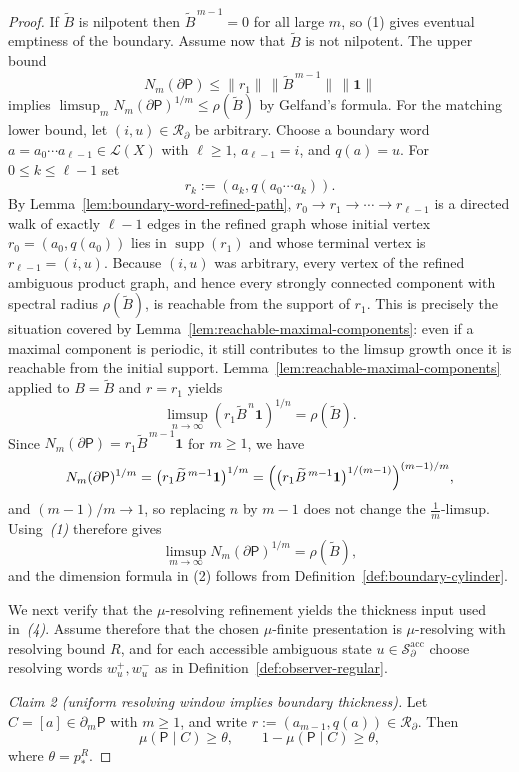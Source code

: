 \documentclass{etds}%
\numberwithin{equation}{section}
\theoremstyle{plain}
\theoremstyle{definition}
\theoremstyle{remark}
\begin{document}
\begin{proof}
If $\widetilde{B}$ is nilpotent then $\widetilde{B}^{\,m-1}=0$ for all large $m$,
so (1) gives eventual emptiness of the boundary.  Assume now that
$\widetilde{B}$ is not nilpotent.  The upper
bound
\[
N_m(\partial\mathsf{P})\le \|r_1\|\,\|\widetilde{B}^{\,m-1}\|\,\|\mathbf{1}\|
\]
implies
$\limsup_m N_m(\partial\mathsf{P})^{1/m}\le \rho(\widetilde{B})$ by Gelfand's formula.
For the matching lower bound, let $(i,u)\in\mathcal{R}_\partial$ be arbitrary.
Choose a boundary word
$a=a_0\cdots a_{\ell-1}\in\mathcal{L}(X)$ with $\ell\ge 1$, $a_{\ell-1}=i$,
and $q(a)=u$.  For $0\le k\le \ell-1$ set
\[
r_k:=(a_k,q(a_0\cdots a_k)).
\]
By Lemma~\ref{lem:boundary-word-refined-path},
$r_0\to r_1\to\cdots\to r_{\ell-1}$ is a directed walk of exactly $\ell-1$
edges in the refined graph whose initial vertex $r_0=(a_0,q(a_0))$ lies in
$\operatorname{supp}(r_1)$ and whose terminal vertex is $r_{\ell-1}=(i,u)$.
Because $(i,u)$ was arbitrary, every vertex of
the refined ambiguous product graph, and hence every strongly connected
component with spectral radius $\rho(\widetilde{B})$, is reachable from the
support of $r_1$.  This is precisely the situation covered by
Lemma~\ref{lem:reachable-maximal-components}: even if a maximal component is
periodic, it still contributes to the limsup growth once it is reachable from
the initial support.
Lemma~\ref{lem:reachable-maximal-components} applied to
$B=\widetilde{B}$ and $r=r_1$ yields
\[
\limsup_{n\to\infty}(r_1\widetilde{B}^{\,n}\mathbf{1})^{1/n}
=\rho(\widetilde{B}).
\]
Since $N_m(\partial\mathsf{P})=r_1\widetilde{B}^{\,m-1}\mathbf{1}$ for $m\ge 1$,
we have
\[
N_m(\partial\mathsf{P})^{1/m}
=\bigl(r_1\widetilde{B}^{\,m-1}\mathbf{1}\bigr)^{1/m}
=\Bigl(\bigl(r_1\widetilde{B}^{\,m-1}\mathbf{1}\bigr)^{1/(m-1)}\Bigr)^{(m-1)/m},
\]
and $(m-1)/m\to 1$, so replacing $n$ by $m-1$ does not change the
$\frac1m$-limsup.  Using~\emph{(1)} therefore gives
\[
\limsup_{m\to\infty}N_m(\partial\mathsf{P})^{1/m}=\rho(\widetilde{B}),
\]
and the dimension formula in (2) follows from
Definition~\ref{def:boundary-cylinder}.

We next verify that the $\mu$-resolving refinement yields the thickness input
used in~\emph{(4)}.  Assume therefore that the chosen $\mu$-finite
presentation is $\mu$-resolving with resolving bound $R$, and for each
accessible ambiguous state $u\in\mathcal{S}_\partial^{\mathrm{acc}}$ choose
resolving words $w_u^+,w_u^-$ as in
Definition~\ref{def:observer-regular}.

\smallskip
\noindent\emph{Claim 2 (uniform resolving window implies boundary thickness).}
Let $C=[a]\in\partial_m\mathsf{P}$ with $m\ge 1$, and write
$r:=(a_{m-1},q(a))\in\mathcal{R}_\partial$.  Then
\[
\mu(\mathsf{P}\mid C)\ge \theta,
\qquad
1-\mu(\mathsf{P}\mid C)\ge \theta,
\]
where $\theta=p_*^R$.


\end{proof}
\end{document}
